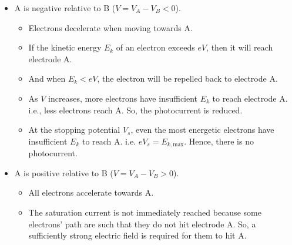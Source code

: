 \documentclass[oneside]{book}
\begin{document}
\begin{minipage}{0.5\textwidth}
    \begin{itemize}
        \item A is negative relative to B (\(V=V_A-V_B<0\)).
        \begin{itemize}
            \item Electrons decelerate when moving towards A.
            \item If the kinetic energy \(E_k\) of an electron exceeds \(eV\), then it will reach electrode A.
            \item And when \(E_k<eV\), the electron will be repelled back to electrode A. 
            \item As \(V\) increases, more electrons have insufficient \(E_k\) to reach electrode A. i.e., less electrons reach A. So, the photocurrent is reduced.
            \item At the stopping potential \(V_s\), even the most energetic electrons have insufficient \(E_k\) to reach A. i.e. \(eV_s=E_{k,\text{max}}\). Hence, there is no photocurrent.  
        \end{itemize}
        \item A is positive relative to B (\(V=V_A-V_B>0\)).
        \begin{itemize}
            \item All electrons accelerate towards A.
            \item The saturation current is not immediately reached because some electrons' path are such that they do not hit electrode A. So, a sufficiently strong electric field is required for them to hit A.
        \end{itemize}
    \end{itemize}
\end{minipage}
\null
\vfill
{}
\end{document}

